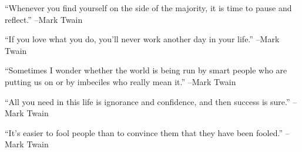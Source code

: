 \documentclass{article}%
\begin{document}
\linebreak%
\vspace{1mm}%
\begin{minipage}{\textwidth}%
\flushleft%
“Whenever you find yourself on the side of the majority, it is time to pause and reflect.”%
\linebreak%
\vspace{1mm}%
–Mark Twain%
\linebreak%
\vspace{1mm}%
\end{minipage}%
\linebreak%
\vspace{1mm}%
\begin{minipage}{\textwidth}%
\flushleft%
“If you love what you do, you'll never work another day in your life.”%
\linebreak%
\vspace{1mm}%
–Mark Twain%
\linebreak%
\vspace{1mm}%
\end{minipage}%
\linebreak%
\vspace{1mm}%
\begin{minipage}{\textwidth}%
\flushleft%
“Sometimes I wonder whether the world is being run by smart people who are putting us on or by imbeciles who really mean it.”%
\linebreak%
\vspace{1mm}%
–Mark Twain%
\linebreak%
\vspace{1mm}%
\end{minipage}%
\linebreak%
\vspace{1mm}%
\begin{minipage}{\textwidth}%
\flushleft%
“All you need in this life is ignorance and confidence, and then success is sure.”%
\linebreak%
\vspace{1mm}%
–Mark Twain%
\linebreak%
\vspace{1mm}%
\end{minipage}%
\linebreak%
\vspace{1mm}%
\begin{minipage}{\textwidth}%
\flushleft%
“It's easier to fool people than to convince them that they have been fooled.”%
\linebreak%
\vspace{1mm}%
–Mark Twain%
\linebreak%
\vspace{1mm}%
\end{minipage}%
\end{document}
